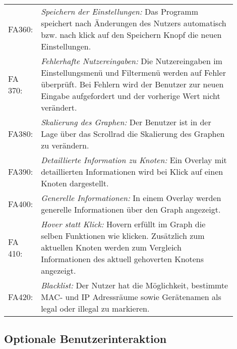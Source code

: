 \begin{tabular}{lp{0.9\linewidth}}

FA360: & \textit{Speichern der Einstellungen: }Das Programm speichert nach Änderungen des Nutzers automatisch bzw. nach klick auf den Speichern Knopf die neuen Einstellungen. \\

FA 370: & \textit{Fehlerhafte Nutzereingaben: }Die Nutzereingaben im Einstellungsmenü und Filtermenü werden auf Fehler überprüft. Bei Fehlern wird der Benutzer zur neuen Eingabe aufgefordert und der vorherige Wert nicht verändert. \\

FA380: & \textit{Skalierung des Graphen: }Der Benutzer ist in der Lage über das Scrollrad die Skalierung des Graphen zu verändern. \\

FA390: & \textit{Detaillierte Information zu Knoten: }Ein Overlay mit detaillierten Informationen wird bei Klick auf einen Knoten dargestellt. \\

FA400: & \textit{Generelle Informationen: }In einem Overlay werden generelle Informationen über den Graph angezeigt. \\

FA 410: & \textit{Hover statt Klick: }Hovern erfüllt im Graph die selben Funktionen wie klicken. Zusätzlich zum aktuellen Knoten werden zum Vergleich Informationen des aktuell gehoverten Knotens angezeigt. \\

FA420: & \textit{Blacklist: }Der Nutzer hat die Möglichkeit, bestimmte MAC- und IP Adressräume sowie Gerätenamen als legal oder illegal zu markieren. \\

\end{tabular}

\subsection{Optionale Benutzerinteraktion}


